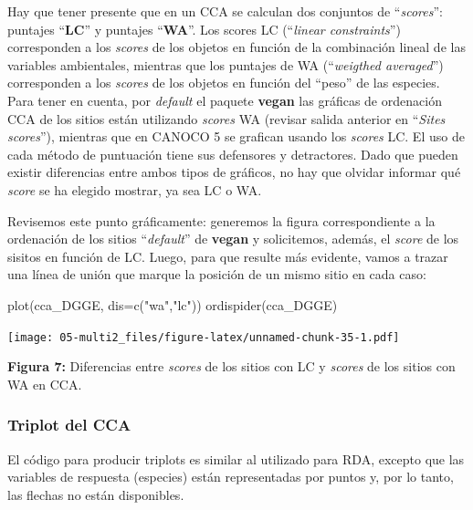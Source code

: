 \documentclass[
]{book}
\newenvironment{Shaded}{\begin{snugshade}}{\end{snugshade}}
\newcommand{\AttributeTok}[1]{\textcolor[rgb]{0.77,0.63,0.00}{#1}}
\newcommand{\FunctionTok}[1]{\textcolor[rgb]{0.00,0.00,0.00}{#1}}
\newcommand{\NormalTok}[1]{#1}
\newcommand{\StringTok}[1]{\textcolor[rgb]{0.31,0.60,0.02}{#1}}
\begin{document}
Hay que tener presente que en un CCA se calculan dos conjuntos de ``\emph{scores}'': puntajes ``\textbf{LC}'' y puntajes ``\textbf{WA}''. Los scores LC (``\emph{linear constraints}'') corresponden a los \emph{scores} de los objetos en función de la combinación lineal de las variables ambientales, mientras que los puntajes de WA (``\emph{weigthed averaged}'') corresponden a los \emph{scores} de los objetos en función del ``peso'' de las especies. Para tener en cuenta, por \emph{default} el paquete \textbf{vegan} las gráficas de ordenación CCA de los sitios están utilizando \emph{scores} WA (revisar salida anterior en ``\emph{Sites scores}''), mientras que en CANOCO 5 se grafican usando los \emph{scores} LC. El uso de cada método de puntuación tiene sus defensores y detractores. Dado que pueden existir diferencias entre ambos tipos de gráficos, no hay que olvidar informar qué \emph{score} se ha elegido mostrar, ya sea LC o WA.

Revisemos este punto gráficamente: generemos la figura correspondiente a la ordenación de los sitios ``\emph{default}'' de \textbf{vegan} y solicitemos, además, el \emph{score} de los sisitos en función de LC. Luego, para que resulte más evidente, vamos a trazar una línea de unión que marque la posición de un mismo sitio en cada caso:

\begin{Shaded}
\begin{Highlighting}[]
\FunctionTok{plot}\NormalTok{(cca\_DGGE, }\AttributeTok{dis=}\FunctionTok{c}\NormalTok{(}\StringTok{"wa"}\NormalTok{,}\StringTok{"lc"}\NormalTok{))}
\FunctionTok{ordispider}\NormalTok{(cca\_DGGE)}
\end{Highlighting}
\end{Shaded}

\texttt{[image: 05-multi2\_files/figure-latex/unnamed-chunk-35-1.pdf]}

\textbf{Figura 7:} Diferencias entre \emph{scores} de los sitios con LC y \emph{scores} de los sitios con WA en CCA.

\hypertarget{triplot-del-cca}{%
\subsubsection{Triplot del CCA}\label{triplot-del-cca}}

El código para producir triplots es similar al utilizado para RDA, excepto que las variables de respuesta (especies) están representadas por puntos y, por lo tanto, las flechas no están disponibles.
\end{document}
